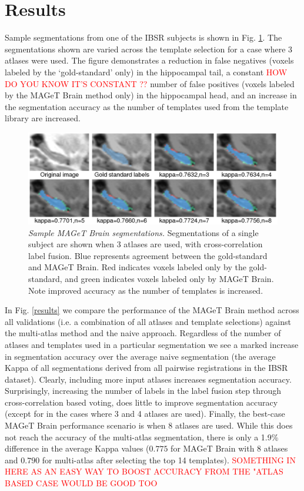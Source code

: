 \documentclass{article}
\newcommand{\todo}[1]{
    \textcolor{red}{#1}
}
\begin{document}
\section{Results}

Sample segmentations from one of the IBSR subjects is shown in Fig.
\ref{montage}.  The segmentations shown are varied across the template
selection for a case where 3 atlases were used.  The figure demonstrates a
reduction in false negatives (voxels labeled by the `gold-standard' only)
in the hippocampal tail, a constant \todo{HOW DO YOU KNOW IT'S CONSTANT ??}  number of false positives (voxels
labeled by the MAGeT Brain method only) in the hippocampal head, and an
increase in the segmentation accuracy as the number of templates used from
the template library are increased.  

\begin{figure}[h]
\begin{minipage}[b]{1.0\linewidth}
  \centering
  \includegraphics[width=\textwidth]{montage.png}
\end{minipage}
\caption{{\em Sample MAGeT Brain segmentations.} Segmentations of a single
subject are shown when 3 atlases are used, with cross-correlation label
fusion. Blue represents agreement between the gold-standard and MAGeT
Brain.  Red indicates voxels labeled only by the gold-standard, and green
indicates voxels labeled only by MAGeT Brain. Note improved accuracy as the
number of templates is increased.} 
\label{montage}
\end{figure}

In Fig. \ref{results} we compare the performance of the MAGeT Brain method
across all validations (i.e. a combination of all atlases and template
selections) against the multi-atlas method and the naive approach.
Regardless of the number of atlases and templates used in a particular
segmentation we see a marked increase in segmentation accuracy over the
average naive segmentation (the average Kappa of all segmentations derived
from all pairwise registrations in the IBSR dataset).  Clearly, including
more input atlases increases segmentation accuracy.  Surprisingly,
increasing the number of labels in the label fusion step through
cross-correlation based voting, does little to improve segmentation
accuracy (except for in the cases where 3 and 4 atlases are used).
Finally, the best-case MAGeT Brain performance scenario is when 8 atlases
are used.  While this does not reach the accuracy of the multi-atlas
segmentation, there is only a 1.9\% difference in the average Kappa values
($0.775$ for MAGeT Brain with 8 atlases and $0.790$ for multi-atlas after
selecting the top 14 templates).  \todo{SOMETHING IN HERE AS AN EASY WAY TO BOOST ACCURACY FROM THE "ATLAS BASED CASE WOULD BE GOOD TOO}
\end{document}
